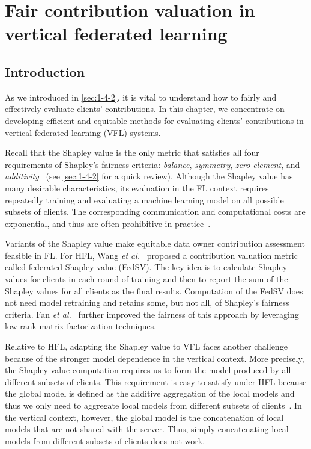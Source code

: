 \chapter{Fair contribution valuation in vertical federated
learning}
\label{ch:Val-VFL}

\section{Introduction} \label{sec:8-1}
As we introduced in \autoref{sec:1-4-2}, it is vital to understand how to fairly and effectively evaluate clients' contributions. In this chapter, we concentrate on developing efficient and equitable methods for evaluating clients' contributions in vertical federated learning (VFL) systems.

Recall that the Shapley value is the only metric that satisfies all four requirements of Shapley's fairness criteria: \emph{balance}, \emph{symmetry}, \emph{zero element}, and \emph{additivity}~\cite{dubey1975uniqueness} (see \autoref{sec:1-4-2} for a quick review).  Although the Shapley value has many desirable characteristics, its evaluation in the FL context requires repeatedly training and evaluating a machine learning model on all possible subsets of clients. The corresponding communication and computational costs are exponential, and thus are often prohibitive in practice~\cite{song2019profit,wang2019measure,fan2021improving}. 

Variants of the Shapley value make equitable data owner contribution assessment feasible in FL. For HFL, Wang \textit{et al.}~\cite{wang2020principled} proposed a contribution valuation metric called federated Shapley value (FedSV). The key idea is to calculate Shapley values for clients in each round of training and then to report the sum of the Shapley values for all clients as the final results. Computation of the FedSV does not need model retraining and retains some, but not all, of Shapley's fairness criteria. Fan \textit{et al.}~\cite{fan2021improving} further improved the fairness of this approach by leveraging low-rank matrix factorization techniques. 

Relative to HFL, adapting the Shapley value to VFL faces another challenge because of the stronger model dependence in the vertical context. More precisely, the Shapley value computation requires us to form the model produced by all different subsets of clients. This requirement is easy to satisfy under HFL because the global model is defined as the additive aggregation of the local models and thus we only need to aggregate local models from different subsets of clients~\cite{wang2020principled}. In the vertical context, however, the global model is the concatenation of local models that are not shared with the server. Thus, simply concatenating local models from different subsets of clients does not work. 

